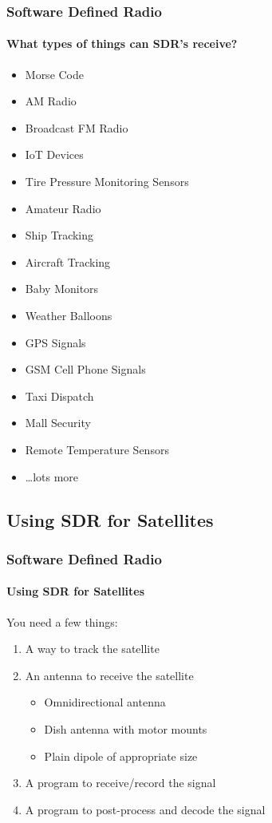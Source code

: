\documentclass[]{beamer}
\begin{document}
\begin{frame}
    \frametitle{Software Defined Radio}
    \framesubtitle{What types of things can SDR's receive?}
    \begin{itemize}
        \item Morse Code
        \item AM Radio
        \item Broadcast FM Radio
        \item IoT Devices
        \item Tire Pressure Monitoring Sensors
        \item Amateur Radio
        \item Ship Tracking
        \item Aircraft Tracking
        \item Baby Monitors
        \item Weather Balloons
        \item GPS Signals
        \item GSM Cell Phone Signals
        \item Taxi Dispatch
        \item Mall Security
        \item Remote Temperature Sensors
        \item \dots lots more
    \end{itemize}
\end{frame}
\subsection{Using SDR for Satellites}
\begin{frame}
    \frametitle{Software Defined Radio}
    \framesubtitle{Using SDR for Satellites}
    You need a few things:
    \begin{enumerate}
        \item A way to track the satellite
        \item An antenna to receive the satellite
            \begin{itemize}
                \item Omnidirectional antenna
                \item Dish antenna with motor mounts
                \item Plain dipole of appropriate size
            \end{itemize}
        \item A program to receive/record the signal
        \item A program to post-process and decode the signal
    \end{enumerate}
\end{frame}
\end{document}
